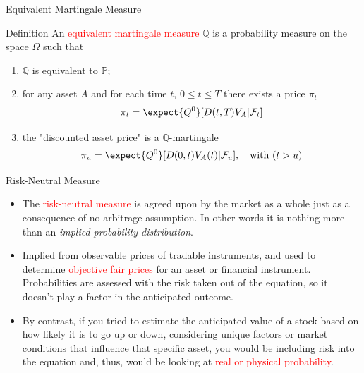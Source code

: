 \documentclass{beamer}
\begin{document}
\begin{frame}{Equivalent Martingale Measure}
	\begin{block}{Definition}
		An \textcolor{red}{equivalent martingale measure} $\mathbb{Q}$ is a probability measure on the space $\Omega$ such that
		\begin{enumerate}
			\item $\mathbb{Q}$ is equivalent to $\mathbb{P}$;
			\item for any asset $A$ and for each time $t$, $0\le t\le T$ there exists a price $\pi_t$
			\begin{equation*}
				\pi_t = \expect{Q^0}[D(t,T)V_A|\mathcal{F}_t]
			\end{equation*}
			\item the "discounted asset price" is a $\mathbb{Q}$-martingale
			\begin{equation*}
				\pi_u = \expect{Q^0}[D(0,t)V_A(t)|\mathcal{F}_u], \quad\text{with }(t>u)
			\end{equation*}
		\end{enumerate}
	\end{block}
\end{frame}

\begin{frame}{Risk-Neutral Measure}
	\begin{itemize}
	\item<1->The \textcolor{red}{risk-neutral measure} is agreed upon by the market as a whole just as a consequence of no arbitrage assumption.
	In other words it is nothing more than an \emph{implied probability distribution}.
	\item<2-> Implied from observable prices of tradable instruments, and used to determine \textcolor{red}{objective fair prices} for an asset or financial instrument. Probabilities are assessed with the risk taken out of the equation, so it doesn’t play a factor in the anticipated outcome.
	\item<3-> By contrast, if you tried to estimate the anticipated value of a stock based on how likely it is to go up or down, considering unique factors or market conditions that influence that specific asset, you would be including risk into the equation and, thus, would be looking at \textcolor{red}{real or physical probability}.
	\end{itemize}
\end{frame}
\end{document}
